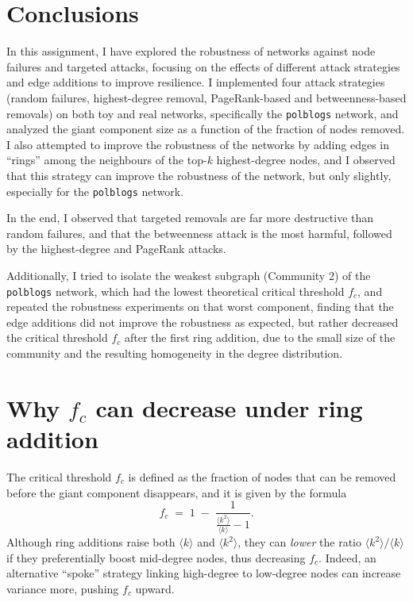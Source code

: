 \documentclass{article}
\begin{document}
\section{Conclusions}
In this assignment, I have explored the robustness of networks against node failures and targeted attacks, focusing on the effects of different attack strategies and edge additions to improve resilience.
I implemented four attack strategies (random failures, highest-degree removal, PageRank-based and betweenness-based removals) on both toy and real networks, specifically the \texttt{polblogs} network, and analyzed the giant component size as a function of the fraction of nodes removed.
I also attempted to improve the robustness of the networks by adding edges in “rings” among the neighbours of the top-$k$ highest-degree nodes, and I observed that this strategy can improve the robustness of the network, but only slightly, especially for the \texttt{polblogs} network.

In the end, I observed that targeted removals are far more destructive than random failures, and that the betweenness attack is the most harmful, followed by the highest-degree and PageRank attacks.

Additionally, I tried to isolate the weakest subgraph (Community 2) of the \texttt{polblogs} network, which had the lowest theoretical critical threshold $f_c$, and repeated the robustness experiments on that worst component, finding that the edge additions did not improve the robustness as expected, but rather decreased the critical threshold $f_c$ after the first ring addition, due to the small size of the community and the resulting homogeneity in the degree distribution.


\appendix \label{sec:appendix}

\section[Why fc can decrease under ring addition]{Why $f_c$ can decrease under ring addition}
The critical threshold $f_c$ is defined as the fraction of nodes that can be removed before the giant component disappears, and it is given by the formula
\[
  f_c \;=\;1\;-\;\frac{1}{\tfrac{\langle k^2\rangle}{\langle k\rangle}-1}.
\]
Although ring additions raise both $\langle k\rangle$ and $\langle k^2\rangle$, they can \emph{lower} the ratio $\langle k^2\rangle/\langle k\rangle$ if they preferentially boost mid-degree nodes, thus decreasing $f_c$.  Indeed, an alternative “spoke” strategy linking high-degree to low-degree nodes can increase variance more, pushing $f_c$ upward.
\end{document}
